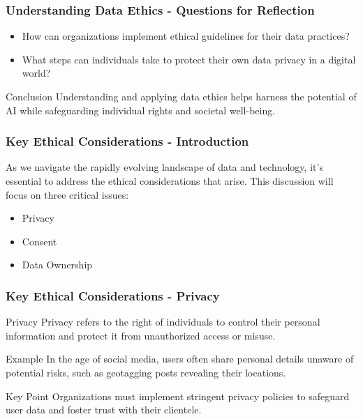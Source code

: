 \documentclass[aspectratio=169]{beamer}
\begin{document}
\begin{frame}[fragile]
    \frametitle{Understanding Data Ethics - Questions for Reflection}
    \begin{itemize}
        \item How can organizations implement ethical guidelines for their data practices?
        \item What steps can individuals take to protect their own data privacy in a digital world?
    \end{itemize}
    \begin{block}{Conclusion}
        Understanding and applying data ethics helps harness the potential of AI while safeguarding individual rights and societal well-being.
    \end{block}
\end{frame}

\begin{frame}[fragile]
    \frametitle{Key Ethical Considerations - Introduction}
    As we navigate the rapidly evolving landscape of data and technology, it's essential to address the ethical considerations that arise. This discussion will focus on three critical issues:
    \begin{itemize}
        \item Privacy
        \item Consent
        \item Data Ownership
    \end{itemize}
\end{frame}

\begin{frame}[fragile]
    \frametitle{Key Ethical Considerations - Privacy}
    \begin{block}{Privacy}
        Privacy refers to the right of individuals to control their personal information and protect it from unauthorized access or misuse.
    \end{block}
    \begin{exampleblock}{Example}
        In the age of social media, users often share personal details unaware of potential risks, such as geotagging posts revealing their locations.
    \end{exampleblock}
    \begin{block}{Key Point}
        Organizations must implement stringent privacy policies to safeguard user data and foster trust with their clientele.
    \end{block}
\end{frame}
\end{document}
